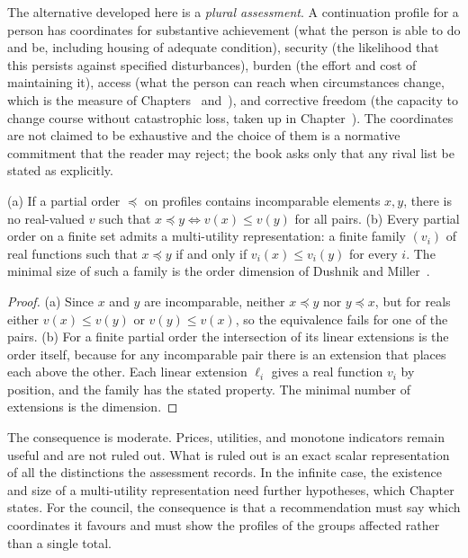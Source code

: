 The alternative developed here is a \emph{plural assessment}. A continuation profile for a person has coordinates for substantive achievement (what the person is able to do and be, including housing of adequate condition), security (the likelihood that this persists against specified disturbances), burden (the effort and cost of maintaining it), access (what the person can reach when circumstances change, which is the measure of Chapters~ and~), and corrective freedom (the capacity to change course without catastrophic loss, taken up in Chapter~). The coordinates are not claimed to be exhaustive and the choice of them is a normative commitment that the reader may reject; the book asks only that any rival list be stated as explicitly.

\begin{theorem}\label{thm:P13}
(a) If a partial order $\preceq$ on profiles contains incomparable elements $x,y$, there is no real-valued $v$ such that $x\preceq y\Leftrightarrow v(x)\le v(y)$ for all pairs. (b) Every partial order on a finite set admits a multi-utility representation: a finite family $(v_i)$ of real functions such that $x\preceq y$ if and only if $v_i(x)\le v_i(y)$ for every $i$. The minimal size of such a family is the order dimension of Dushnik and Miller~\cite{dushnik1941}.
\end{theorem}

\begin{proof}
(a) Since $x$ and $y$ are incomparable, neither $x\preceq y$ nor $y\preceq x$, but for reals either $v(x)\le v(y)$ or $v(y)\le v(x)$, so the equivalence fails for one of the pairs. (b) For a finite partial order the intersection of its linear extensions is the order itself, because for any incomparable pair there is an extension that places each above the other. Each linear extension $\ell_i$ gives a real function $v_i$ by position, and the family has the stated property. The minimal number of extensions is the dimension.
\end{proof}

The consequence is moderate. Prices, utilities, and monotone indicators remain useful and are not ruled out. What is ruled out is an exact scalar representation of all the distinctions the assessment records. In the infinite case, the existence and size of a multi-utility representation need further hypotheses, which Chapter~ states. For the council, the consequence is that a recommendation must say which coordinates it favours and must show the profiles of the groups affected rather than a single total.

